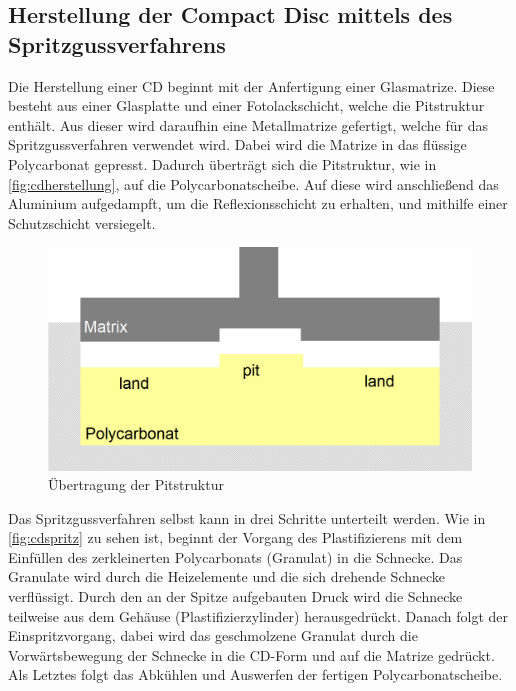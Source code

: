 \subsection{Herstellung der Compact Disc mittels des Spritzgussverfahrens}
\label{subsec:cdherstellung}

Die Herstellung einer CD beginnt mit der Anfertigung einer Glasmatrize. Diese
besteht aus einer Glasplatte und einer Fotolackschicht, welche die Pitstruktur
enthält. Aus dieser wird daraufhin eine Metallmatrize gefertigt, welche für das
Spritzgussverfahren verwendet wird. Dabei wird die Matrize in das flüssige
Polycarbonat gepresst. Dadurch überträgt sich die Pitstruktur, wie in
\autoref{fig:cdherstellung}, auf die Polycarbonatscheibe. Auf diese wird
anschließend das Aluminium aufgedampft, um die Reflexionsschicht zu erhalten,
und mithilfe einer Schutzschicht versiegelt. \cite{cdp}

\begin{figure}[h]
    \begin{center}
        \begin{minipage}[t]{\textwidth}
            \begin{center}
                \includegraphics[height=0.1\textheight]{Bilder/Optische_Datentraeger_Die_Compact_Disc/Herstellung/cdherstellung.png}
                \caption[Übertragung der Pitstruktur \newline \url{http://daten.didaktikchemie.uni-bayreuth.de/umat/cd_dvd/spritzguss.gif} (zuletzt aufgerufen am 07.08.2015)]{Übertragung der Pitstruktur}
                \label{fig:cdherstellung}
            \end{center}
        \end{minipage}
    \end{center}
\end{figure}

Das Spritzgussverfahren selbst kann in drei Schritte unterteilt werden. Wie in
\autoref{fig:cdspritz} zu sehen ist, beginnt der Vorgang des Plastifizierens mit
dem Einfüllen des zerkleinerten Polycarbonats (Granulat) in die Schnecke. Das
Granulate wird durch die Heizelemente und die sich drehende Schnecke
verflüssigt. Durch den an der Spitze aufgebauten Druck wird die Schnecke
teilweise aus dem Gehäuse (Plastifizierzylinder) herausgedrückt. Danach folgt
der Einspritzvorgang, dabei wird das geschmolzene Granulat durch die
Vorwärtsbewegung der Schnecke in die CD-Form und auf die Matrize gedrückt. Als
Letztes folgt das Abkühlen und Auswerfen der fertigen Polycarbonatscheibe.
\cite{cdpf}

